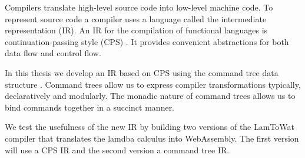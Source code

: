 
Compilers translate high-level source code into low-level machine code. To represent source code a compiler uses a language called the intermediate representation (IR). An IR for the compilation of functional languages is continuation-passing style (CPS)  \autocite{steele1978rabbit, DBLP:books/daglib/0022396}. It provides convenient abstractions for both data flow and control flow.

In this thesis we develop an IR based on CPS using the command tree data structure \autocite{commandtreespoulsen}. Command trees allow us to express compiler transformations typically, declaratively and modularly. The monadic nature of command trees allows us to bind commands together in a succinct manner.

We test the usefulness of the new IR by building two versions of the LamToWat compiler that translates the lamdba calculus into WebAssembly. The first version will use a CPS IR and the second version a command tree IR.